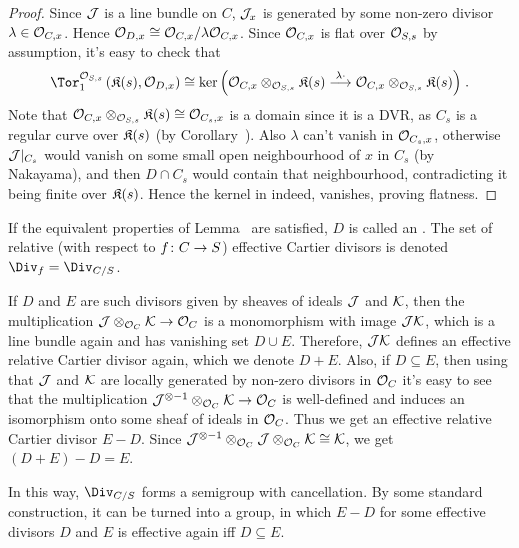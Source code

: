 \documentclass[a4paper,parskip=half,numbers=enddot, DIV=12]{scrreprt}
\begin{document}
\begin{proof}
	Since $\mathcal{J}$ is a line bundle on $C$, $\mathcal{J}_x$ is generated by some non-zero divisor $\lambda\in\mathcal{O}_{C,x}$. Hence $\mathcal{O}_{D,x}\cong \mathcal{O}_{C,x}/\lambda\mathcal{O}_{C,x}$. Since $\mathcal{O}_{C,x}$ is flat over $\mathcal{O}_{S,s}$ by assumption, it's easy to check that
	\begin{align}\lbl{eq:TorKer}
		\Tor_1^{\Oo_{S,s}}\left(\KK(s),\Oo_{D,x}\right)\cong \ker\Big(\Oo_{C,x}\otimes_{\Oo_{S,s}}\KK(s)\morphism[\lambda\cdot]\Oo_{C,x}\otimes_{\Oo_{S,s}}\KK(s)\Big)\;.
	\end{align}
	Note that $\mathcal{O}_{C,x}\otimes_{\mathcal{O}_{S,s}}\mathfrak{K}(s)\cong \mathcal{O}_{C_s,x}$ is a domain since it is a DVR, as $C_s$ is a regular curve over $\mathfrak{K}(s)$ (by Corollary~). Also $\lambda$ can't vanish in $\mathcal{O}_{C_s,x}$, otherwise $\mathcal{J}|_{C_s}$ would vanish on some small open neighbourhood of $x$ in $C_s$ (by Nakayama), and then $D\cap C_s$ would contain that neighbourhood, contradicting it being finite over $\mathfrak{K}(s)$. Hence the kernel in  indeed, vanishes, proving flatness.
\end{proof}
\begin{defi}
	If the equivalent properties of Lemma~ are satisfied, $D$ is called an . The set of relative (with respect to $f\colon C\morphism S$) effective Cartier divisors is denoted $\Div_f=\Div_{C/S}$.
\end{defi}
\begin{rem}
	If $D$ and $E$ are such divisors given by sheaves of ideals $\mathcal{J}$ and $\mathcal{K}$, then the multiplication $\Jj\otimes_{\Oo_C}\Kk \morphism\Oo_C$ is a monomorphism with image $\mathcal{J}\mathcal{K}$, which is a line bundle again and has vanishing set $D\cup E$. Therefore, $\mathcal{J}\mathcal{K}$ defines an effective relative Cartier divisor again, which we denote $D+E$. Also, if $D\subseteq E$, then using that $\mathcal{J}$ and $\mathcal{K}$ are locally generated by non-zero divisors in $\mathcal{O}_C$ it's easy to see that the multiplication $\Jj^{\otimes -1}\otimes_{\Oo_C}\Kk\morphism \Oo_C$ is well-defined and induces an isomorphism onto some sheaf of ideals in $\mathcal{O}_C$. Thus we get an effective relative Cartier divisor $E-D$. Since $\mathcal{J}^{\otimes -1}\otimes_{\mathcal{O}_C}\mathcal{J}\otimes_{\mathcal{O}_C}\mathcal{K}\cong \mathcal{K}$, we get $(D+E)-D=E$.
		
	In this way, $\Div_{C/S}$ forms a semigroup with cancellation. By some standard construction, it can be turned into a group, in which $E-D$ for some effective divisors $D$ and $E$ is effective again iff $D\subseteq E$.
\end{rem}
\end{document}
